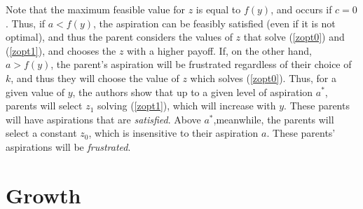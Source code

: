 \documentclass[11pt]{article}
\begin{document}
    Note that the maximum feasible value for \( z \) is equal to \( f(y) \), and occurs if \( c = 0 \). Thus, if \( a < f(y) \), the aspiration can be feasibly satisfied (even if it is not optimal), and thus the parent considers the values of \( z \) that solve (\ref{zopt0}) and (\ref{zopt1}), and chooses the \( z \) with a higher payoff. If, on the other hand, \( a > f(y) \), the parent's aspiration will be frustrated regardless of their choice of \( k \), and thus they will choose the value of \( z \) which solves (\ref{zopt0}). 
    Thus, for a given value of \( y \), the authors show that up to a given level of aspiration \( a^* \), parents will select \( z_1 \) solving (\ref{zopt1}), which will increase with \( y \). These parents will have aspirations that are \textit{satisfied}. Above \( a^* \),meanwhile, the parents will select a constant \( z_0 \), which is insensitive to their aspiration \( a \). These parents' aspirations will be \textit{frustrated}. 
    \section{Growth}
\end{document}
